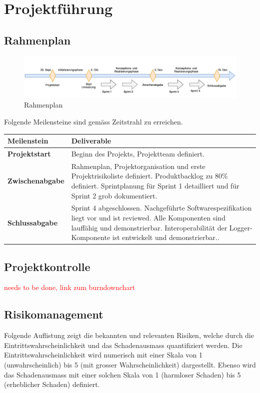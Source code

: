 \section{Projektführung}
\subsection{Rahmenplan}
\begin{figure}[H]
	\centering
	\includegraphics[width=\linewidth]{2_Projektfuehrung/Bilder/rahmenplan.png}
	\caption{Rahmenplan}
	\label{fig: Rahmenplan}
\end{figure}
Folgende Meilensteine sind gemäss Zeitstrahl zu erreichen.
\begin{center}
	\begin{tabularx}{\textwidth}{|X|X|}
		\hline
		\textbf{Meilenstein} & \textbf{Deliverable} \\
		\hline
		\textbf{Projektstart} & Beginn des Projekts, Projektteam definiert. \\
		\hline
		\textbf{Zwischenabgabe} & Rahmenplan, Projektorganisation und erste Projektrisikoliste definiert. Produktbacklog zu 80\% definiert. Sprintplanung für Sprint 1 detailliert und für Sprint 2 grob dokumentiert. \\
		\hline
		\textbf{Schlussabgabe} & Sprint 4 abgeschlossen. Nachgeführte Softwarespezifikation liegt vor und ist reviewed. Alle Komponenten sind lauffähig und demonstrierbar. Interoperabilität der Logger-Komponente ist entwickelt und demonstrierbar.. \\
		\hline
	\end{tabularx}
\end{center}
\subsection{Projektkontrolle}
\textcolor{red}{needs to be done, link zum burndownchart}
\subsection{Risikomanagement}
Folgende Auflistung zeigt die bekannten und relevanten Risiken, welche durch die Eintrittswahrscheinlichkeit und das Schadenausmass quantifiziert werden. Die Eintrittswahrscheinlichkeit wird numerisch mit einer Skala von 1 (unwahrscheinlich) bis 5 (mit grosser Wahrscheinlichkeit) dargestellt. Ebenso wird das Schadenausmass mit einer solchen Skala von 1 (harmloser Schaden) bis 5 (erheblicher Schaden) definiert.

